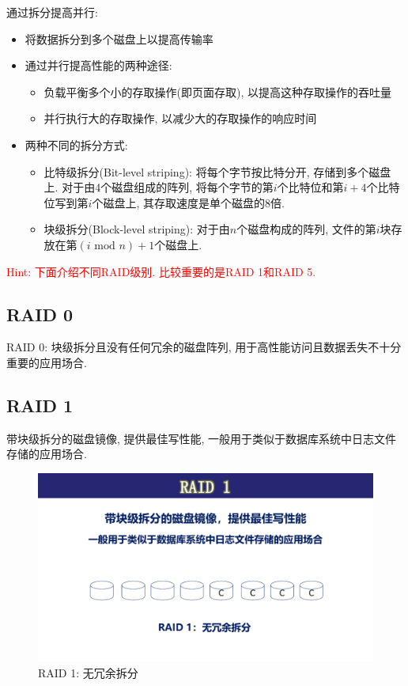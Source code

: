通过拆分提高并行:
\begin{itemize}
    \item 将数据拆分到多个磁盘上以提高传输率
    \item 通过并行提高性能的两种途径:
    \begin{itemize}
        \item 负载平衡多个小的存取操作(即页面存取), 以提高这种存取操作的吞吐量
        \item 并行执行大的存取操作, 以减少大的存取操作的响应时间
    \end{itemize}
    \item 两种不同的拆分方式:
    \begin{itemize}
        \item 比特级拆分(Bit-level striping): 将每个字节按比特分开, 存储到多个磁盘上. 对于由4个磁盘组成的阵列, 将每个字节的第$i$个比特位和第$i+4$个比特位写到第$i$个磁盘上, 其存取速度是单个磁盘的8倍.
        \item 块级拆分(Block-level striping): 对于由$n$个磁盘构成的阵列, 文件的第$i$块存放在第$(i \text{ mod } n) + 1$个磁盘上.
    \end{itemize}
\end{itemize}

\textcolor{red}{Hint: 下面介绍不同RAID级别. 比较重要的是RAID 1和RAID 5.}

\subsection{RAID 0}

RAID 0: 块级拆分且没有任何冗余的磁盘阵列, 用于高性能访问且数据丢失不十分重要的应用场合.

\subsection{RAID 1}

带块级拆分的磁盘镜像, 提供最佳写性能, 一般用于类似于数据库系统中日志文件存储的应用场合.
\begin{figure}[H]
    \centering
    \includegraphics[width=.6\textwidth]{figure/RAID-1.pdf}
    \caption{RAID 1: 无冗余拆分}
\end{figure}

